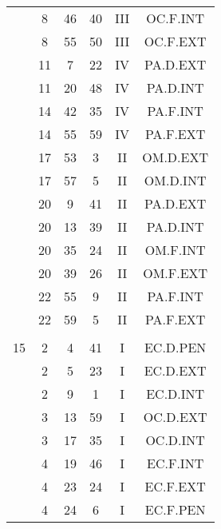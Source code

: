 \documentclass[12pt, a4paper]{article}
\begin{document}
\begin{multicols}{3}
{\begin{tabular}{c c c c c c}
	 	 	 	 & 8 & 46 & 40 & III & OC.F.INT\\%
	 	 	 	 & 8 & 55 & 50 & III & OC.F.EXT\\%
	 	 	 	 & 11 & 7 & 22 & IV & PA.D.EXT\\%
	 	 	 	 & 11 & 20 & 48 & IV & PA.D.INT\\%
	 	 	 	 & 14 & 42 & 35 & IV & PA.F.INT\\%
	 	 	 	 & 14 & 55 & 59 & IV & PA.F.EXT\\%
	 	 	 	 & 17 & 53 & 3 & II & OM.D.EXT\\%
	 	 	 	 & 17 & 57 & 5 & II & OM.D.INT\\%
	 	 	 	 & 20 & 9 & 41 & II & PA.D.EXT\\%
	 	 	 	 & 20 & 13 & 39 & II & PA.D.INT\\%
	 	 	 	 & 20 & 35 & 24 & II & OM.F.INT\\%
	 	 	 	 & 20 & 39 & 26 & II & OM.F.EXT\\%
	 	 	 	 & 22 & 55 & 9 & II & PA.F.INT\\%
	 	 	 	 & 22 & 59 & 5 & II & PA.F.EXT\\%
	 	 	 	 & & & & & \\%
	 	 	 	15 & 2 & 4 & 41 & I & EC.D.PEN\\%
	 	 	 	 & 2 & 5 & 23 & I & EC.D.EXT\\%
	 	 	 	 & 2 & 9 & 1 & I & EC.D.INT\\%
	 	 	 	 & 3 & 13 & 59 & I & OC.D.EXT\\%
	 	 	 	 & 3 & 17 & 35 & I & OC.D.INT\\%
	 	 	 	 & 4 & 19 & 46 & I & EC.F.INT\\%
	 	 	 	 & 4 & 23 & 24 & I & EC.F.EXT\\%
	 	 	 	 & 4 & 24 & 6 & I & EC.F.PEN\\%

\end{tabular}}
\end{multicols}
\end{document}
